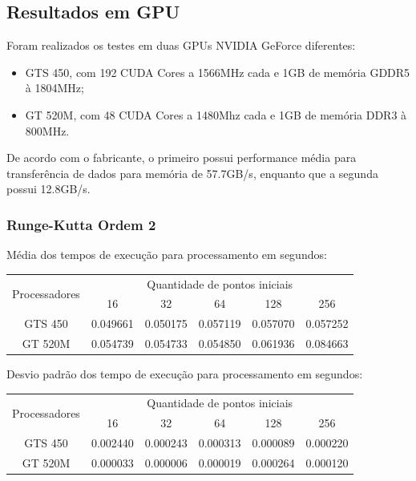   \subsection{Resultados em GPU}
    Foram realizados os testes em duas GPUs NVIDIA GeForce diferentes:
  \begin{itemize}
    \item GTS 450, com 192 CUDA Cores a 1566MHz cada e 1GB de memória GDDR5 à 1804MHz;
    \item GT 520M, com 48 CUDA Cores a 1480Mhz cada e 1GB de memória DDR3 à 800MHz.
  \end{itemize}
  
  De acordo com o fabricante, o primeiro possui performance média para transferência de dados para memória de 57.7GB/s, enquanto que a segunda possui 12.8GB/s.
    \subsubsection{Runge-Kutta Ordem 2}
    Média dos tempos de execução para processamento em segundos:\\
    \begin{tabular}{| c | c | c | c | c | c |}
      \hline
      \multirow{2}{*}{Processadores}& \multicolumn{5}{|c|}{Quantidade de pontos iniciais} \\ \cline{2-6}
      & 16 & 32 & 64 & 128 & 256 \\ \hline
      GTS 450 & 0.049661 & 0.050175 & 0.057119 & 0.057070 & 0.057252 \\ \hline
      GT 520M & 0.054739 & 0.054733 & 0.054850 & 0.061936 & 0.084663 \\ \hline

      \hline
    \end{tabular}
    
    \hspace{1mm}\newline
    
    \noindent Desvio padrão dos tempo de execução para processamento em segundos:\\
    \begin{tabular}{| c | c | c | c | c | c |}
      \hline
      \multirow{2}{*}{Processadores}& \multicolumn{5}{|c|}{Quantidade de pontos iniciais} \\ \cline{2-6}
      & 16 & 32 & 64 & 128 & 256 \\ \hline
      GTS 450 & 0.002440 & 0.000243 & 0.000313 & 0.000089 & 0.000220 \\ \hline
      GT 520M & 0.000033 & 0.000006 & 0.000019 & 0.000264 & 0.000120 \\ \hline

      \hline
    \end{tabular}
    
